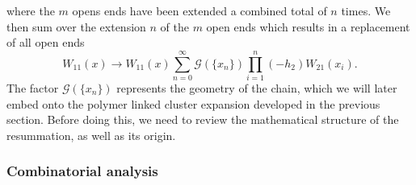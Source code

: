 where the $m$ opens ends have been extended a combined total of $n$ times. We
then sum over the extension $n$ of the $m$ open ends which results in a
replacement of all open ends
%
\begin{equation} \label{eq:chain_subst}
  W_{11}(x) \to W_{11}(x) \sum_{n=0}^{\infty} \mathcal{G}(\{x_n\}) \prod_{i=1}^{n} (-h_2) W_{21}(x_i).
\end{equation}
%
The factor $\mathcal{G}(\{x_n\})$ represents the geometry of the chain, which we
will later embed onto the polymer linked cluster expansion developed in the
previous section. Before doing this, we need to review the mathematical structure
of the resummation, as well as its origin.

\subsubsection{Combinatorial analysis}

